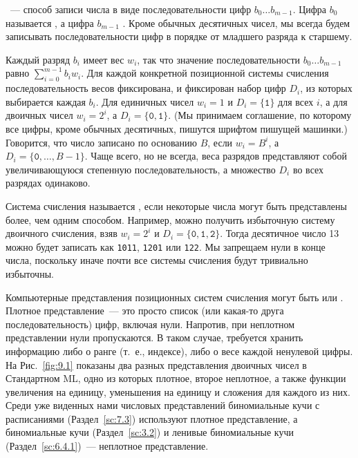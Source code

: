 \cite{Knuth1973b}~--- способ записи числа в виде последовательности
цифр $b_0\ldots b_{m-1}$. Цифра $b_0$ называется , а цифра $b_{m-1}$ . Кроме обычных десятичных чисел, мы всегда будем
записывать последовательности цифр в порядке от младшего разряда к старшему.

Каждый разряд $b_i$ имеет вес $w_i$, так что значение
последовательности $b_0\ldots b_{m-1}$ равно $\sum_{i=0}^{m-1}
b_iw_i$. Для каждой конкретной позиционной системы счисления
последовательность весов фиксирована, и фиксирован набор цифр $D_i$,
из которых выбирается каждая $b_i$. Для единичных чисел $w_i = 1$ и
$D_i = \{\mathtt{1}\}$ для всех $i$, а для двоичных чисел $w_i = 2^i$,
а $D_i = \{\mathtt{0}, \mathtt{1}\}$. (Мы принимаем соглашение, по
которому все цифры, кроме обычных десятичных, пишутся шрифтом пишущей
машинки.) Говорится, что число записано по основанию $B$, если $w_i =
B^i$, а $D_i = \{\mathtt{0}, \ldots, B-1\}$. Чаще всего, но не всегда,
веса разрядов представляют собой увеличивающуюся степенную
последовательность, а множество $D_i$ во всех разрядах одинаково.

Система счисления называется , если
некоторые числа могут быть представлены более, чем одним способом.
Например, можно получить избыточную систему двоичного счисления, взяв
$w_i = 2^i$ и $D_i = \{\mathtt{0}, \mathtt{1}, \mathtt{2}\}$. Тогда
десятичное число 13 можно будет записать как \texttt{1011},
\texttt{1201} или \texttt{122}. Мы запрещаем нули в конце числа,
поскольку иначе почти все системы счисления будут тривиально
избыточны.

Компьютерные представления позиционных систем счисления могут быть
 или . Плотное
представление~--- это просто список (или какая-то друга
последовательность) цифр, включая нули. Напротив, при неплотном
представлении нули пропускаются. В таком случае, требуется хранить
информацию либо о ранге (т.~е., индексе), либо о весе каждой ненулевой
цифры.  На Рис.~\ref{fig:9.1} показаны два разных представления
двоичных чисел в Стандартном ML, одно из которых плотное, второе
неплотное, а также функции увеличения на единицу, уменьшения на
единицу и сложения для каждого из них. Среди уже виденных нами
числовых представлений биномиальные кучи с расписаниями
(Раздел~\ref{sc:7.3}) используют плотное представление, а биномиальные
кучи (Раздел~\ref{sc:3.2}) и ленивые биномиальные кучи
(Раздел~\ref{sc:6.4.1})~--- неплотное представление.

